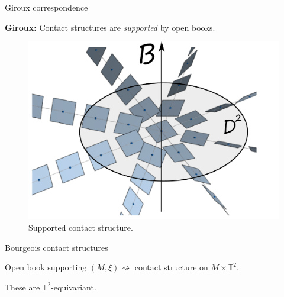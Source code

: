 \documentclass{beamer}
\begin{document}
\begin{frame}{Giroux correspondence}

\begin{tcolorbox}
\textbf{Giroux:} Contact structures are \emph{supported} by open books.
\end{tcolorbox} 

\begin{figure}
    \centering
    \includegraphics[width=0.6\linewidth]{standardctct.pdf}
    \caption{Supported contact structure.}
    \label{fig:adapted}
\end{figure}

\end{frame}

\begin{frame}{Bourgeois contact structures}
    \begin{theorem}[Bourgeois '02]
    Open book supporting $(M,\xi)\rightsquigarrow$ contact structure on $M\times \mathbb T^2$.
    \end{theorem}

 These are $\mathbb T^2$-equivariant.   
    
\end{frame}
\end{document}
